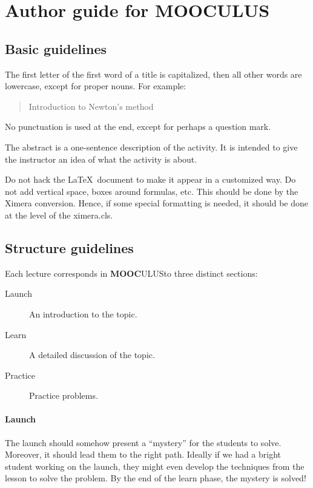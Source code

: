 \documentclass{article}
\newcommand{\mooculus}{\textsf{\textbf{MOOC}\textnormal{\textsf{ULUS}}}}
\begin{document}
\section*{Author guide for \mooculus}

\subsection*{Basic guidelines}

The first letter of the first word of a title is capitalized, then all
other words are lowercase, except for proper nouns. For example:
\begin{quote}
Introduction to Newton's method
\end{quote}
No punctuation is used at the end, except for perhaps a question mark.


The abstract is a one-sentence description of the activity. It is
intended to give the instructor an idea of what the activity is about.


Do not hack the \LaTeX\ document to make it appear in a customized
way. Do not add vertical space, boxes around formulas, etc. This
should be done by the Ximera conversion. Hence, if some special
formatting is needed, it should be done at the level of the
ximera.cls.

\subsection*{Structure guidelines}

Each lecture corresponds in \mooculus to three distinct sections:
\begin{description}
\item[Launch] An introduction to the topic.
\item[Learn] A detailed discussion of the topic.
\item[Practice] Practice problems.
\end{description}

\paragraph{Launch}

The launch should somehow present a ``mystery'' for the students to
solve.  Moreover, it should lead them to the right path. Ideally if we
had a bright student working on the launch, they might even develop
the techniques from the lesson to solve the problem.  By the end of
the learn phase, the mystery is solved!
\end{document}
